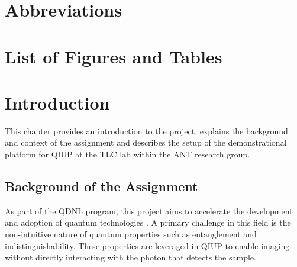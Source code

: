 \documentclass[12pt,a4paper]{article}
\begin{document}
\section*{Abbreviations}
\begin{acronym}[KPZ101] %
\end{acronym}

\newpage
\section*{List of Figures and Tables}
\listoffigures
\listoftables

\newpage
\section{Introduction}
This chapter provides an introduction to the project, explains the background and context of the assignment and describes the setup of the demonstrational platform for \ac{QIUP} at the \ac{TLC} lab within the \ac{ANT} research group.

\subsection{Background of the Assignment}
    As part of the QDNL program, this project aims to accelerate the development and adoption of quantum technologies \cite{quantum_delta}.
    A primary challenge in this field is the non-intuitive nature of quantum properties such as entanglement and indistinguishability. These properties are leveraged in \ac{QIUP} to enable imaging without directly interacting with the photon that detects the sample.
\end{document}
